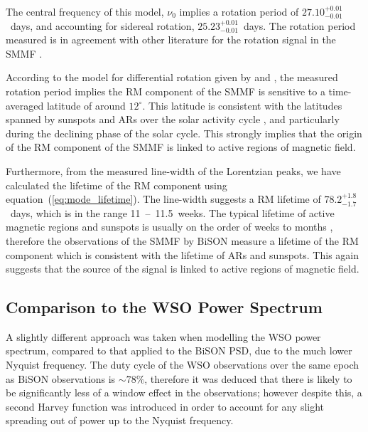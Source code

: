 The central frequency of this model, $\nu_0$ implies a rotation period of $27.10^{+0.01}_{-0.01}$~days, and accounting for sidereal rotation, $25.23^{+0.01}_{-0.01}$~days. The rotation period measured is in agreement with other literature for the rotation signal in the SMMF \citep{chaplin_studies_2003, xie_temporal_2017}. 

According to the model for differential rotation given by \citet{snodgrass_magnetic_1983} and \citet{brown_inferring_1989}, the measured rotation period implies the RM component of the SMMF is sensitive to a time-averaged latitude of around $12^{\circ}$. This latitude is consistent with the latitudes spanned by sunspots and ARs over the solar activity cycle \citep{maunder_note_1904, mcintosh_deciphering_2014, thomas_asteroseismic_2019}, and particularly during the declining phase of the solar cycle. This strongly implies that the origin of the RM component of the SMMF is linked to active regions of magnetic field.

Furthermore, from the measured line-width of the Lorentzian peaks, we have calculated the lifetime of the RM component using equation~(\ref{eq:mode_lifetime}). The line-width suggests a RM lifetime of $78.2_{-1.7}^{+1.8}$~days, which is in the range 11~--~11.5~weeks. The typical lifetime of active magnetic regions and sunspots is usually on the order of weeks to months \citep{zwaan_solar_1981, howard_sunspot_2001, hathaway_sunspot_2008}, therefore the observations of the SMMF by BiSON measure a lifetime of the RM component which is consistent with the lifetime of ARs and sunspots. This again suggests that the source of the signal is linked to active regions of magnetic field.


\subsection{Comparison to the WSO Power Spectrum}\label{sec:WSO_reults}

A slightly different approach was taken when modelling the WSO power spectrum, compared to that applied to the BiSON PSD, due to the much lower Nyquist frequency. The duty cycle of the WSO observations over the same epoch as BiSON observations is $\sim 78\%$, therefore it was deduced that there is likely to be significantly less of a window effect in the observations; however despite this, a second Harvey function was introduced in order to account for any slight spreading out of power up to the Nyquist frequency.

